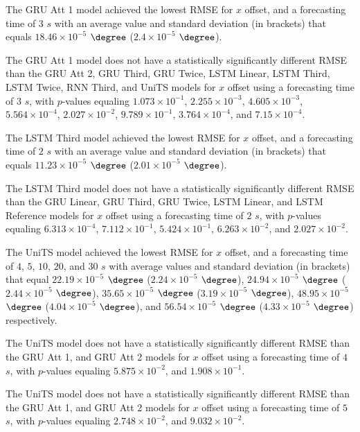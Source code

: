 The GRU Att 1 model achieved the lowest RMSE for $x$ offset, and a forecasting time of $3$ $s$ with an average value and standard deviation (in brackets) that equals $18.46 \times 10^{-5}$ $\degree$ ($2.4 \times 10^{-5}$ $\degree$).

The GRU Att 1 model does not have a statistically significantly different RMSE than the GRU Att 2, GRU Third, GRU Twice, LSTM Linear, LSTM Third, LSTM Twice, RNN Third, and UniTS models for $x$ offset using a forecasting time of $3$ $s$, with $p$-values equaling $1.073 \times 10^{-1}$, $2.255 \times 10^{-3}$, $4.605 \times 10^{-3}$, $5.564 \times 10^{-4}$, $2.027 \times 10^{-2}$, $9.789 \times 10^{-1}$, $3.764 \times 10^{-4}$, and $7.15 \times 10^{-4}$.

The LSTM Third model achieved the lowest RMSE for $x$ offset, and a forecasting time of $2$ $s$ with an average value and standard deviation (in brackets) that equals $11.23 \times 10^{-5}$ $\degree$ ($2.01 \times 10^{-5}$ $\degree$).

The LSTM Third model does not have a statistically significantly different RMSE than the GRU Linear, GRU Third, GRU Twice, LSTM Linear, and LSTM Reference models for $x$ offset using a forecasting time of $2$ $s$, with $p$-values equaling $6.313 \times 10^{-4}$, $7.112 \times 10^{-1}$, $5.424 \times 10^{-1}$, $6.263 \times 10^{-2}$, and $2.027 \times 10^{-2}$.

The UniTS model achieved the lowest RMSE for $x$ offset, and a forecasting time of $4$, $5$, $10$, $20$, and $30$ $s$ with average values and standard deviation (in brackets) that equal $22.19 \times 10^{-5}$ $\degree$ ($2.24 \times 10^{-5}$ $\degree$), $24.94 \times 10^{-5}$ $\degree$ ($2.44 \times 10^{-5}$ $\degree$), $35.65 \times 10^{-5}$ $\degree$ ($3.19 \times 10^{-5}$ $\degree$), $48.95 \times 10^{-5}$ $\degree$ ($4.04 \times 10^{-5}$ $\degree$), and $56.54 \times 10^{-5}$ $\degree$ ($4.33 \times 10^{-5}$ $\degree$) respectively.

The UniTS model does not have a statistically significantly different RMSE than the GRU Att 1, and GRU Att 2 models for $x$ offset using a forecasting time of $4$ $s$, with $p$-values equaling $5.875 \times 10^{-2}$, and $1.908 \times 10^{-1}$.

The UniTS model does not have a statistically significantly different RMSE than the GRU Att 1, and GRU Att 2 models for $x$ offset using a forecasting time of $5$ $s$, with $p$-values equaling $2.748 \times 10^{-2}$, and $9.032 \times 10^{-2}$.

